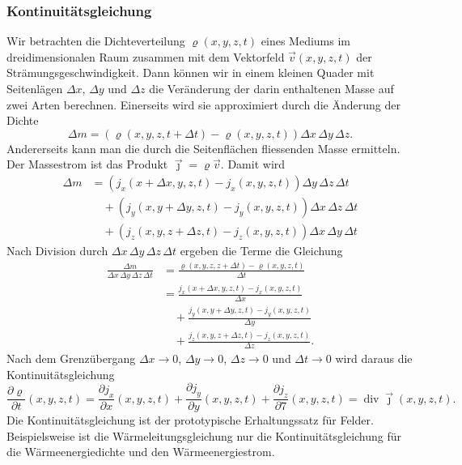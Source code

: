 \subsubsection{Kontinuitätsgleichung}
Wir betrachten die Dichteverteilung $\varrho(x,y,z,t)$ eines Mediums
im dreidimensionalen Raum zusammen mit dem Vektorfeld $\vec{v}(x,y,z,t)$
der Strämungsgeschwindigkeit.
Dann können wir in einem kleinen Quader mit Seitenlägen
$\Delta x$,
$\Delta y$
und
$\Delta z$
die Veränderung der darin enthaltenen Masse auf zwei Arten berechnen.
Einerseits wird sie approximiert durch die Änderung der Dichte
\[
\Delta m
=
(\varrho(x,y,z,t+\Delta t)-\varrho(x,y,z,t))
\Delta x
\,
\Delta y
\,
\Delta z.
\]
Andererseits kann man die durch die Seitenflächen fliessenden Masse
ermitteln.
Der Massestrom ist das Produkt $\vec{\jmath}=\varrho\vec{v}$.
Damit wird
\begin{align*}
\Delta m
&=
(
j_x(x+\Delta x,y,z,t)
-
j_x(x,y,z,t)
)
\Delta y\,\Delta z \, \Delta t
\\
&\quad
+
(
j_y(x,y+\Delta y,z,t)
-
j_y(x,y,z,t)
)
\Delta x\,\Delta z \, \Delta t
\\
&\quad
+
(
j_z(x,y,z+\Delta z,t)
-
j_z(x,y,z,t)
)
\Delta x\,\Delta y \, \Delta t
\end{align*}
Nach Division durch $\Delta x\, \Delta y\, \Delta z\,\Delta t$ ergeben
die Terme die Gleichung
\begin{align*}
\frac{\Delta m}{\Delta x\,\Delta y\,\Delta z\,\Delta t}
&=
\frac{\varrho(x,y,z,z+\Delta t)-\varrho(x,y,z,t)}{\Delta t}
\\
&=
\frac{
j_x(x+\Delta x,y,z,t)
-
j_x(x,y,z,t)
}{
\Delta x
}
\\
&\quad
+
\frac{
j_y(x,y+\Delta y,z,t)
-
j_y(x,y,z,t)
}{
\Delta y
}
\\
&\quad
+
\frac{
j_z(x,y,z+\Delta z,t)
-
j_z(x,y,z,t)
}{
\Delta z
}.
\end{align*}
Nach dem Grenzübergang
$\Delta x\to 0$,
$\Delta y\to 0$,
$\Delta z\to 0$
und
$\Delta t\to 0$
wird daraus die Kontinuitätsgleichung
\begin{equation}
\frac{\partial \varrho}{\partial t}(x,y,z,t)
=
\frac{\partial j_x}{\partial x}(x,y,z,t)
+
\frac{\partial j_y}{\partial y}(x,y,z,t)
+
\frac{\partial j_z}{\partial 7}(x,y,z,t)
=
\operatorname{div}\vec{\jmath}(x,y,z,t).
\label{buch:symmetrien:felder:eqn:kontinuitaet}
\end{equation}
Die Kontinuitätsgleichung ist der prototypische Erhaltungssatz für
Felder.
Beispielsweise ist die Wärmeleitungsgleichung nur die Kontinuitätsgleichung
für die Wärmeenergiedichte und den Wärmeenergiestrom.

